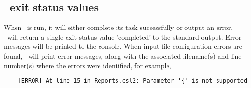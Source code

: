 \subsection{\CNAME\ exit status values}

When \CNAME\ is run, it will either complete its task successfully or output an error. \CNAME\ will return a single exit status value 'completed' to the standard output. Error messages will be printed to the console. When input file configuration errors are found, \CNAME\ will print error messages, along with the associated filename(s) and line number(s) where the errors were identified, for example,

{\small{\begin{verbatim}
	[ERROR] At line 15 in Reports.csl2: Parameter '{' is not supported
\end{verbatim}}}
